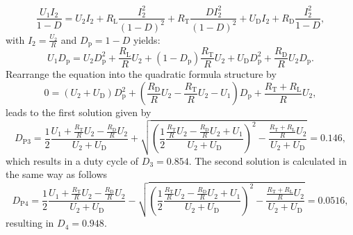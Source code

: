 \begin{solutionblock}
\begin{equation}
		\frac{U_1 I_2}{1 -D} = U_2 I_2 + R_{\mathrm{L}}\frac{I_2^2}{\left(1-D\right)^2} + R_{\mathrm{T}} \frac{D I_2^2}{\left(1-D\right)^2} + U_{\mathrm{D}}I_2 + R_{\mathrm{D}}\frac{I_2^2}{1-D},
	\end{equation}
	with $I_2 = \frac{U_2}{R}$ and $D_{\mathrm{p}} = 1-D$ yields:
	\begin{equation}
		U_1 D_{\mathrm{p}} = U_2 D_{\mathrm{p}}^2 + \frac{R_{\mathrm{L}}}{R} U_2 + (1-D_{\mathrm{p}}) \frac{R_{\mathrm{T}}}{R}U_2 + U_{\mathrm{D}}D_{\mathrm{p}}^2 + \frac{R_{\mathrm{D}}}{R}U_2 D_{\mathrm{p}}.
	\end{equation}
	Rearrange the equation into the quadratic formula structure by
	\begin{equation}
		0 = \left(U_2 + U_{\mathrm{D}} \right)D_{\mathrm{p}}^2 + \left(\frac{R_{\mathrm{D}}}{R}U_2 - \frac{R_{\mathrm{T}}}{R}U_2 -U_1\right)D_{\mathrm{p}} + \frac{R_{\mathrm{T}}+R_{\mathrm{L}}}{R} U_2,
	\end{equation}
	leads to the first solution given by
	\begin{equation}
		D_{\mathrm{P3}} = \frac{1}{2} \frac{U_1 +\frac{R_{\mathrm{T}}}{R}U_2 - \frac{R_{\mathrm{D}}}{R}U_2}{U_2 + U_{\mathrm{D}}} + \sqrt{\left(\frac{1}{2} \frac{\frac{R_{\mathrm{T}}}{R}U_2 - \frac{R_{\mathrm{D}}}{R}U_2 + U_1}{U_2 + U_{\mathrm{D}}}\right)^2 - \frac{\frac{R_{\mathrm{T}}+R_{\mathrm{L}}}{R}U_2}{U_2+U_{\mathrm{D}}}}
		= 0.146,
	\end{equation}
	which results in a duty cycle of $D_3 = 0.854$.	The second solution is calculated in the same way as follows
	\begin{equation}
		D_{\mathrm{P4}} = \frac{1}{2} \frac{U_1 +\frac{R_{\mathrm{T}}}{R}U_2 - \frac{R_{\mathrm{D}}}{R}U_2}{U_2 + U_{\mathrm{D}}} - \sqrt{\left(\frac{1}{2} \frac{\frac{R_{\mathrm{T}}}{R}U_2 - \frac{R_{\mathrm{D}}}{R}U_2 + U_1}{U_2 + U_{\mathrm{D}}}\right)^2 - \frac{\frac{R_{\mathrm{T}}+R_{\mathrm{L}}}{R}U_2}{U_2+U_{\mathrm{D}}}}
		= 0.0516,
	\end{equation}
	resulting in $D_4 = 0.948$.
\end{solutionblock}


